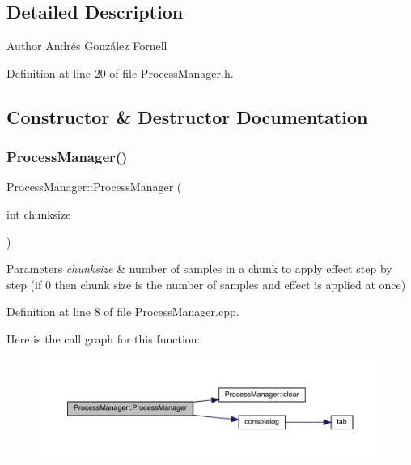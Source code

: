 \subsection{Detailed Description}
\begin{DoxyAuthor}{Author}
Andrés González Fornell 
\end{DoxyAuthor}


Definition at line 20 of file Process\+Manager.\+h.



\subsection{Constructor \& Destructor Documentation}
\mbox{\label{class_process_manager_a875b49ae7a67b7629615747320ff30b7}} 
\subsubsection{\texorpdfstring{Process\+Manager()}{ProcessManager()}}
{\footnotesize\ttfamily Process\+Manager\+::\+Process\+Manager (\begin{DoxyParamCaption}\item[{int}]{chunksize }\end{DoxyParamCaption})}


\begin{DoxyParams}{Parameters}
{\em chunksize} & number of samples in a chunk to apply effect step by step (if 0 then chunk size is the number of samples and effect is applied at once) \\
\hline
\end{DoxyParams}


Definition at line 8 of file Process\+Manager.\+cpp.

Here is the call graph for this function\+:
\nopagebreak
\begin{figure}[H]
\begin{center}
\leavevmode
\includegraphics[width=350pt]{class_process_manager_a875b49ae7a67b7629615747320ff30b7_cgraph}
\end{center}
\end{figure}


